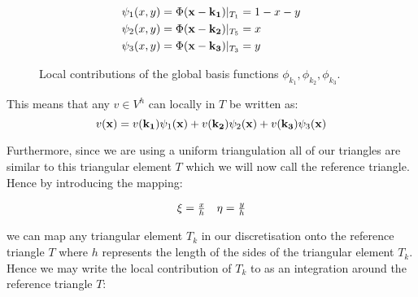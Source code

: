 \begin{align}\label{eq:twod-local-basis}
    \begin{split}
        \psi_1(x, y) = \Phi(\mathbf{x} - \mathbf{k_1})|_{T_1} &= 1 - x - y \\
        \psi_2(x, y) = \Phi(\mathbf{x} - \mathbf{k_2})|_{T_5} &= x \\
        \psi_3(x, y) = \Phi(\mathbf{x} - \mathbf{k_3})|_{T_3} &= y
    \end{split}
\end{align}

\begin{figure}
\centering
\begin{subfigure}[b]{0.30\textwidth}
    \centering
    \resizebox{\linewidth}{!}{}
\end{subfigure}
\begin{subfigure}[b]{0.30\textwidth}
    \centering
    \resizebox{\linewidth}{!}{}
\end{subfigure}
\begin{subfigure}[b]{0.30\textwidth}
    \centering
    \resizebox{\linewidth}{!}{}
\end{subfigure}
\caption{Local contributions of the global basis functions
         $\phi_{k_1}, \phi_{k_2}, \phi_{k_3}$.}
\label{fig:twod-local-basis}
\end{figure}

This means that any $v \in V^h$ can locally in $T$ be written as:
\[
    v(\mathbf{x}) = v(\mathbf{k_1})\psi_1(\mathbf{x}) + v(\mathbf{k_2})\psi_2(\mathbf{x}) + v(\mathbf{k_3})\psi_3(\mathbf{x})
\]

Furthermore, since we are using a uniform triangulation all of our triangles
are similar to this triangular element $T$ which we will now call the reference
triangle. Hence by introducing the mapping:

\begin{align*}
 \begin{array}{c c}
    \xi = \frac{x}{h} & \eta = \frac{y}{h}
 \end{array}
\end{align*}

we can map any triangular element $T_k$ in our discretisation onto the
reference triangle $T$ where $h$ represents the length of the sides of the
triangular element $T_k$. Hence we may write the local contribution of $T_k$ to
 as an integration around the reference
triangle $T$:

